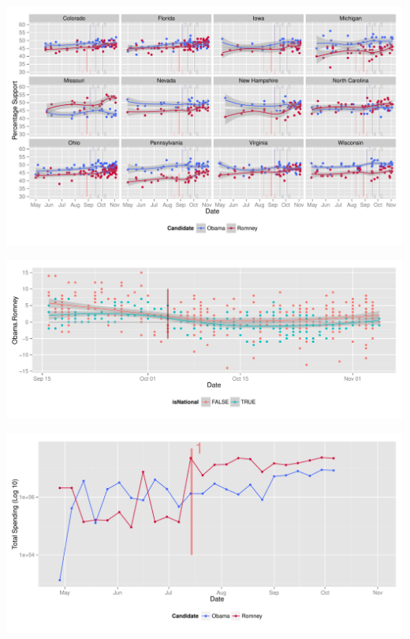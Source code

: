 \documentclass[11pt]{article}\usepackage{graphicx, color}
\newenvironment{knitrout}{}{} %
\begin{document}
\begin{knitrout}
\color{fgcolor}

{\centering \includegraphics[width=\textwidth]{figure/type_swing_1} 

}


\end{knitrout}


\begin{knitrout}
\color{fgcolor}

{\centering \includegraphics[width=\textwidth]{figure/type_swing_2} 

}


\end{knitrout}



\begin{knitrout}
\color{fgcolor}

{\centering \includegraphics[width=\textwidth]{figure/trend_plot} 

}


\end{knitrout}
\end{document}
